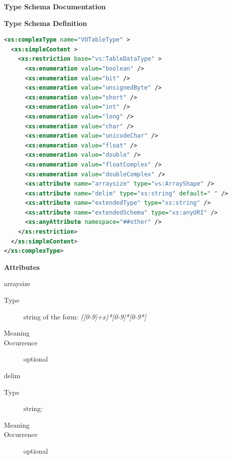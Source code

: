 \documentclass[11pt,a4paper]{ivoa}
\begin{document}
\begin{generated}
\begingroup
      	\renewcommand*\descriptionlabel[1]{%
      	\hbox to 5.5em{\emph{#1}\hfil}}\vspace{2ex}\noindent\textbf{ Type Schema Documentation}


\vspace{1ex}\noindent\textbf{ Type Schema Definition}

\begin{lstlisting}[language=XML,basicstyle=\footnotesize]
<xs:complexType name="VOTableType" >
  <xs:simpleContent >
    <xs:restriction base="vs:TableDataType" >
      <xs:enumeration value="boolean" />
      <xs:enumeration value="bit" />
      <xs:enumeration value="unsignedByte" />
      <xs:enumeration value="short" />
      <xs:enumeration value="int" />
      <xs:enumeration value="long" />
      <xs:enumeration value="char" />
      <xs:enumeration value="unicodeChar" />
      <xs:enumeration value="float" />
      <xs:enumeration value="double" />
      <xs:enumeration value="floatComplex" />
      <xs:enumeration value="doubleComplex" />
      <xs:attribute name="arraysize" type="vs:ArrayShape" />
      <xs:attribute name="delim" type="xs:string" default=" " />
      <xs:attribute name="extendedType" type="xs:string" />
      <xs:attribute name="extendedSchema" type="xs:anyURI" />
      <xs:anyAttribute namespace="##other" />
    </xs:restriction>
  </xs:simpleContent>
</xs:complexType>
\end{lstlisting}

\vspace{0.5ex}\noindent\textbf{ Attributes}

\begingroup\small\begin{bigdescription}
\item[arraysize]
\begin{description}
\item[Type] string of the form: \emph{([0-9]+x)*[0-9]*[0-9*]}
\item[Meaning] 
\item[Occurrence] optional

\end{description}
\item[delim]
\begin{description}
\item[Type] string: 
\item[Meaning] 
\item[Occurrence] optional
 

\end{description}
\end{bigdescription}
\end{generated}
\end{document}
